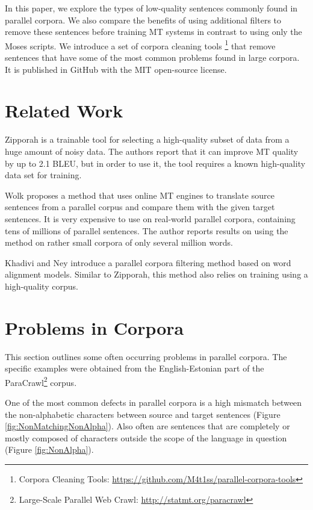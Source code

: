 \documentclass{IOS-Book-Article}
\begin{document}
In this paper, we explore the types of low-quality sentences commonly found in parallel corpora. We also compare the benefits of using additional filters to remove these sentences before training MT systems in contrast to using only the Moses scripts. We introduce a set of corpora cleaning tools
\footnote{Corpora Cleaning Tools: \url{https://github.com/M4t1ss/parallel-corpora-tools} } 
that remove sentences that have some of the most common problems found in large corpora. It is published in GitHub with the MIT open-source license.


\section{Related Work}


Zipporah \cite{Xu2017} is a trainable tool for selecting a high-quality subset of data from a huge amount of noisy data. The authors report that it can improve MT quality by up to 2.1 BLEU, but in order to use it, the tool requires a known high-quality data set for training.

Wolk \cite{Wolk2015NOISY-PARALLELLEVEL} proposes a method that uses online MT engines to translate source sentences from a parallel corpus and compare them with the given target sentences. It is very expensive to use on real-world parallel corpora, containing tens of millions of parallel sentences. The author reports results on using the method on rather small corpora of only several million words.

Khadivi and Ney \cite{Khadivi2005AutomaticTranslation} introduce a parallel corpora filtering method based on word alignment models. Similar to Zipporah, this method also relies on training using a high-quality corpus.


\section{Problems in Corpora}
\label{sec:problems}

This section outlines some often occurring problems in parallel corpora. The specific examples were obtained from the English-Estonian part of the ParaCrawl\footnote{Large-Scale Parallel Web Crawl: \url{http://statmt.org/paracrawl}} corpus.

One of the most common defects in parallel corpora is a high mismatch between the non-alphabetic characters between source and target sentences (Figure \ref{fig:NonMatchingNonAlpha}). Also often are sentences that are completely or mostly composed of characters outside the scope of the language in question (Figure \ref{fig:NonAlpha}).
\end{document}
